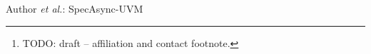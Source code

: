 \documentclass[journal]{IEEEtran}
\begin{document}


\author{%
  Author~Name,~,
  Second~Author%
  \thanks{TODO: draft -- affiliation and contact footnote.}%
}

%
{Author \MakeLowercase{\textit{et al.}}: SpecAsync-UVM}

\maketitle
















\end{document}
